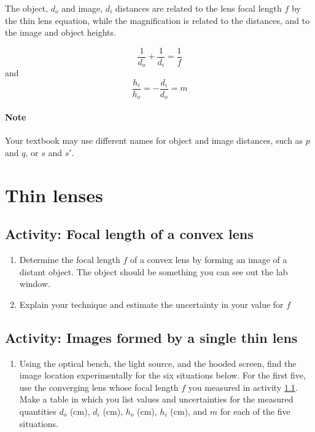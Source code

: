 \begin{multicols}{2}
The object, $d_o$ and image, $d_i$ distances are related to the lens focal length $f$ by the thin lens equation, while the magnification is related to the distances, and to the image and object heights.

\begin{equation} \label{e:thin}
	\frac{1}{d_o} + \frac{1}{d_i} = \frac{1}{f}
\end{equation}
and
\begin{equation} \label{e:thinmag}
	\frac{h_i}{h_o} = -\frac{d_i}{d_o} = m
\end{equation}

\paragraph{Note} Your textbook may use different names for object and image distances, such as $p$ and $q$, or $s$ and $s'$.

\section {Thin lenses}
\subsection{Activity: Focal length of a convex lens}\label{s:focal}
\begin{enumerate}
	\item Determine the focal length $f$ of a convex lens by forming an image of a distant object.  The object should be something you can see out the lab window.
	\item Explain your technique and estimate the uncertainty in your value for $f$
\end{enumerate}

\subsection{Activity: Images formed by a single thin lens}\label{s:thinlens}
\begin{enumerate}
	\item Using the optical bench, the light source, and the hooded screen, find the image location experimentally for the six situations below. For the first five, use the converging lens whose focal length $f$ you measured in activity \ref{s:focal}. Make a table in which you list values and uncertainties for the measured quantities $d_o$ (cm), $d_i$ (cm), $h_o$ (cm), $h_i$ (cm), and  $m$ for each of the five situations.
	

\end{enumerate}
\end{multicols}
